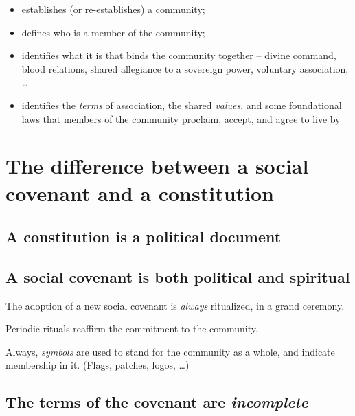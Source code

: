 \documentclass[
]{book}
\providecommand{\tightlist}{%
  \setlength{\itemsep}{0pt}\setlength{\parskip}{0pt}}
\begin{document}
\begin{itemize}
\tightlist
\item
  establishes (or re-establishes) a community;
\item
  defines who is a member of the community;
\item
  identifies what it is that binds the community together -- divine command, blood relations, shared allegiance to a sovereign power, voluntary association, \ldots{}
\item
  identifies the \emph{terms} of association, the shared \emph{values}, and some foundational laws that members of the community proclaim, accept, and agree to live by
\end{itemize}

\hypertarget{the-difference-between-a-social-covenant-and-a-constitution}{%
\section{The difference between a social covenant and a constitution}\label{the-difference-between-a-social-covenant-and-a-constitution}}

\hypertarget{a-constitution-is-a-political-document}{%
\subsection{A constitution is a political document}\label{a-constitution-is-a-political-document}}

\hypertarget{a-social-covenant-is-both-political-and-spiritual}{%
\subsection{A social covenant is both political and spiritual}\label{a-social-covenant-is-both-political-and-spiritual}}

The adoption of a new social covenant is \emph{always} ritualized, in a grand ceremony.

Periodic rituals reaffirm the commitment to the community.

Always, \emph{symbols} are used to stand for the community as a whole, and indicate membership in it. (Flags, patches, logos, \ldots)

\hypertarget{the-terms-of-the-covenant-are-incomplete}{%
\subsection{\texorpdfstring{The terms of the covenant are \emph{incomplete}}{The terms of the covenant are incomplete}}\label{the-terms-of-the-covenant-are-incomplete}}
\end{document}
